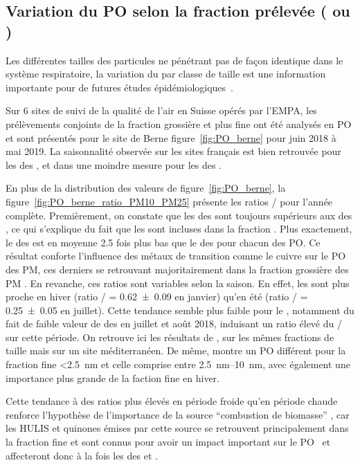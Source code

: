\subsection{Variation du PO selon la fraction prélevée (\PMdix{} ou \PMdc)}%
\label{sub:pm10_pm2_5}

Les différentes tailles des particules ne pénétrant pas de façon identique dans le système
respiratoire, la variation du \POv{} par classe de taille est une information importante
pour de futures études épidémiologiques~\cite{fangOxidative2019}.

Sur 6 sites de suivi de la qualité de l'air en Suisse opérés par l'EMPA, les prélèvements conjoints de la fraction grossière
\PMdix{} et plus fine \PMdc{} ont été analysés en PO et sont présentés pour le site de
Berne figure~\ref{fig:PO_berne} pour juin 2018 à mai 2019. La saisonnalité observée sur
les sites français est bien retrouvée pour les \POv{} des \PMdix, et dans une moindre
mesure pour les \POv{} des \PMdc.

En plus de la distribution des valeurs de \POv{} figure~\ref{fig:PO_berne}, la
figure~\ref{fig:PO_berne_ratio_PM10_PM25} présente les ratios \POv{} \PMdc/\PMdix{} pour
l'année complète. 
Premièrement, on constate que les \POv{} des \PMdix{} sont toujours supérieurs aux \POv{}
des \PMdc, ce qui s'explique du fait que les \PMdc{} sont incluses dans la fraction
\PMdix. Plus exactement, le \POv{} des \PMdc{} est en moyenne 2.5 fois plus bas que le
\POv{} des \PMdix{} pour chacun des PO. Ce résultat conforte l'influence des métaux de
transition comme le cuivre sur le PO des PM, ces derniers se retrouvant majoritairement
dans la fraction grossière des PM .
En revanche, ces ratios sont variables selon la saison. En effet, les \POAAv{} sont
plus proche en hiver (ratio \PMdc/\PMdix{} = \num{0.62(9)} en janvier) qu'en été (ratio
\PMdc/\PMdix{} = \num{0.25(5)} en juillet). Cette tendance semble plus faible pour le
\PODTTv, notamment du fait de faible valeur de \PODTTv{} des \PMdix{} en juillet et août
2018, induisant un ratio élevé du \PODTTv{} \PMdc/\PMdix{} sur cette période.
On retrouve ici les résultats de \cite{perronePM22019}, sur les mêmes fractions de taille 
mais sur un site méditerranéen. De même, \cite{paraskevopoulouYearlong2019} montre un PO 
différent pour la fraction fine \SI{<2.5}{nm} et celle comprise entre \SIrange{2.5}{10}{nm},
avec également une importance plus grande de la faction fine en hiver.

Cette tendance à des ratios plus élevés en période froide qu'en période chaude renforce
l'hypothèse de l'importance de la source ``combustion de biomasse'' , car les HULIS et
quinones émises par cette source se retrouvent principalement dans la fraction fine
\PMdc{}\autocite{linAbundance2010,fangOxidative2019} et sont connus pour avoir un impact
important sur le PO~\autocite{vermaFractionating2015,maSources2018} et affecteront donc à
la fois les \POv{} des \PMdc{} et \PMdix.

